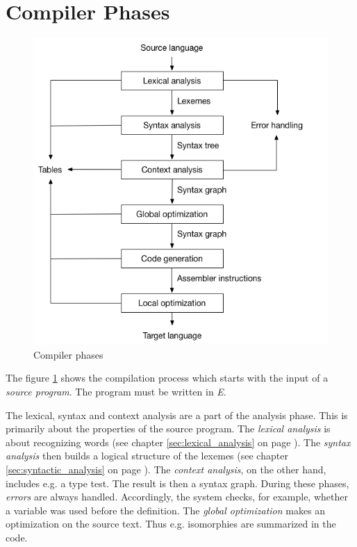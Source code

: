\newpage
\section{Compiler Phases}
\label{sec:compiler_phases}

\begin{figure}[bth]
	\centering
	\includegraphics[scale=0.5]{./img/compiler_phases}
	\caption[Compiler phases]{Compiler phases}
	\label{fig:compiler_phases}
\end{figure}
\noindent

The figure \ref{fig:compiler_phases} shows the compilation process which starts with the input of a \emph{source program}. The program must be written in \emph{E}. 

The lexical, syntax and context analysis are a part of the analysis phase. This is primarily about the properties of the source program. The \emph{lexical analysis} is about recognizing words (see chapter \ref{sec:lexical_analysis} on page \pageref{sec:lexical_analysis}). The \emph{syntax analysis} then builds a logical structure of the lexemes (see chapter \ref{sec:syntactic_analysis} on page \pageref{sec:syntactic_analysis}). The \emph{context analysis}, on the other hand, includes e.g. a type test. The result is then a syntax graph. During these phases, \emph{errors} are always handled. Accordingly, the system checks, for example, whether a variable was used before the definition. The \emph{global optimization} makes an optimization on the source text. Thus e.g. isomorphies are summarized in the code.

